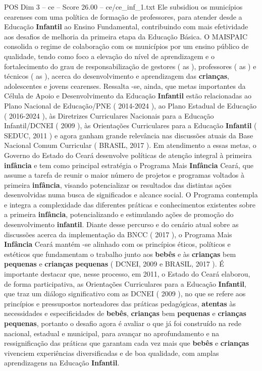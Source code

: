 \begin{textsample}{POS Dim 3 – ce – Score 26.00 – ce/ce\_inf\_1.txt}
Ele subsidiou os municípios cearenses com uma política de formação de professores, para atender desde a Educação \textbf{Infantil} ao Ensino Fundamental, contribuindo com mais efetividade aos desafios de melhoria da primeira etapa da Educação Básica.
O MAISPAIC consolida o regime de colaboração com os municípios por um ensino público de qualidade, tendo como foco a elevação do nível de aprendizagem e o fortalecimento do grau de responsabilização de gestores ( as ), professores ( as ) e técnicos ( as ), acerca do desenvolvimento e aprendizagem das \textbf{crianças}, adolescentes e jovens cearenses.
Ressalta -se, ainda, que metas importantes da Célula de Apoio e Desenvolvimento da Educação \textbf{Infantil} estão relacionadas ao Plano Nacional de Educação/PNE ( 2014-2024 ), ao Plano Estadual de Educação ( 2016-2024 ), às Diretrizes Curriculares Nacionais para a Educação Infantil/DCNEI ( 2009 ), às Orientações Curriculares para a Educação \textbf{Infantil} ( SEDUC, 2011 ) e agora ganham grande relevância nas discussões atuais da Base Nacional Comum Curricular ( BRASIL, 2017 ).
Em atendimento a essas metas, o Governo do Estado do Ceará desenvolve políticas de atenção integral à primeira \textbf{infância} e tem como principal estratégia o Programa Mais \textbf{Infância} Ceará, que assume a tarefa de reunir o maior número de projetos e programas voltados à primeira \textbf{infância}, visando potencializar os resultados das distintas ações desenvolvidas numa busca de significados e alcance social.
O Programa contempla e integra a complexidade das diferentes práticas e conhecimentos existentes sobre a primeira \textbf{infância}, potencializando e estimulando ações de promoção do desenvolvimento \textbf{infantil}.
Diante desse percurso e do cenário atual sobre as discussões acerca da implementação da BNCC ( 2017 ), o Programa Mais \textbf{Infância} Ceará mantém -se alinhado com os princípios éticos, políticos e estéticos que fundamentam o trabalho junto aos \textbf{bebês} e às \textbf{crianças} bem \textbf{pequenas} e \textbf{crianças} \textbf{pequenas} ( DCNEI, 2009 e BRASIL, 2017 ).
É importante destacar que, nesse processo, em 2011, o Estado do Ceará elaborou, de forma participativa, as Orientações Curriculares para a Educação \textbf{Infantil}, que traz um diálogo significativo com as DCNEI ( 2009 ), no que se refere aos princípios e pressupostos norteadores das práticas pedagógicas, \textbf{atentas} às necessidades e especificidades de \textbf{bebês}, \textbf{crianças} bem \textbf{pequenas} e \textbf{crianças} \textbf{pequenas}, portanto o desafio agora é avaliar o que já foi construído na rede nacional, estadual e municipal, para avançar no aprofundamento e na ressignificação das práticas que garantam cada vez mais que \textbf{bebês} e \textbf{crianças} vivenciem experiências diversificadas e de boa qualidade, com amplas aprendizagens na Educação \textbf{Infantil}.

\end{textsample}
